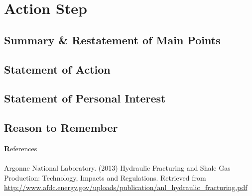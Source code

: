 \documentclass{article}
\begin{document}
  \section{Action Step}
    \subsection{Summary \& Restatement of Main Points}
    \subsection{Statement of Action}
    \subsection{Statement of Personal Interest}
    \subsection{Reason to Remember}


  \newpage
  \begin{center}{\Large \textbf References}
  \end{center}
  \paragraph{}  Argonne National Laboratory. (2013) Hydraulic Fracturing and Shale Gas Production: Technology, Impacts and Regulations. Retrieved from \url{http://www.afdc.energy.gov/uploads/publication/anl_hydraulic_fracturing.pdf}
\end{document}
